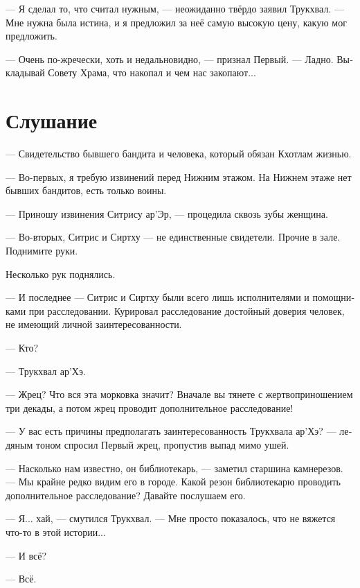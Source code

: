 \documentclass[a4paper,12pt,fleqn]{book}\usepackage{polyglossia}\setdefaultlanguage[babelshorthands=true]{russian}\setotherlanguage{english}\defaultfontfeatures{Ligatures=TeX,Mapping=tex-text}\usepackage{xcolor}\newcommand{\ml}[3]{#2}
\begin{document}
--- Я сделал то, что считал нужным, --- неожиданно твёрдо заявил Трукхвал.
\ml{$0$}
{--- Мне нужна была истина, и я предложил за неё самую высокую цену, какую мог предложить.}
{``I wanted the truth, and I offered the highest price I could.''}

\ml{$0$}
{--- Очень по-жречески, хоть и недальновидно, --- признал Первый.}
{``Very priestly, although unwise,'' Head Priest admitted.}
--- Ладно.
Выкладывай Совету Храма, что накопал и чем нас закопают...

\section{Слушание}

--- Свидетельство бывшего бандита и человека, который обязан Кхотлам жизнью.

--- Во-первых, я требую извинений перед Нижним этажом.
На Нижнем этаже нет бывших бандитов, есть только воины.

--- Приношу извинения Ситрису ар'Эр, --- процедила сквозь зубы женщина.

--- Во-вторых, Ситрис и Сиртху --- не единственные свидетели.
Прочие в зале.
Поднимите руки.

Несколько рук поднялись.

--- И последнее --- Ситрис и Сиртху были всего лишь исполнителями и помощниками при расследовании.
Курировал расследование достойный доверия человек, не имеющий личной заинтересованности.

--- Кто?

--- Трукхвал ар'Хэ.

--- Жрец?
Что вся эта морковка значит?
Вначале вы тянете с жертвоприношением три декады, а потом жрец проводит дополнительное расследование!

--- У вас есть причины предполагать заинтересованность Трукхвала ар'Хэ? --- ледяным тоном спросил Первый жрец, пропустив выпад мимо ушей.

--- Насколько нам известно, он библиотекарь, --- заметил старшина камнерезов.
--- Мы крайне редко видим его в городе.
Какой резон библиотекарю проводить дополнительное расследование?
Давайте послушаем его.

--- Я... хай, --- смутился Трукхвал.
\ml{$0$}
{--- Мне просто показалось, что не вяжется что-то в этой истории...}
{``I just felt something strange about that story ...''}

\ml{$0$}
{--- И всё?}
{``And?''}

\ml{$0$}
{--- Всё.}
{``That's it.''}
\end{document}
